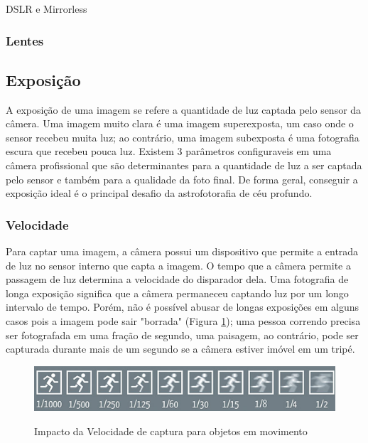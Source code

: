 DSLR e Mirrorless

\subsubsection{Lentes}

\subsection{Exposição}

A exposição de uma imagem se refere a quantidade de luz captada pelo sensor da câmera. Uma imagem muito clara é uma imagem superexposta, um caso onde o sensor recebeu muita luz; ao contrário, uma imagem subexposta é uma fotografia escura que recebeu pouca luz. Existem 3 parâmetros configuraveis em uma câmera profissional que são determinantes para a quantidade de luz a ser captada pelo sensor e também para a qualidade da foto final. \cite{site:eduardoemonica} De forma geral, conseguir a exposição ideal é o principal desafio da astrofotorafia de céu profundo. \cite{livro:astropratica}


\subsubsection{Velocidade}

Para captar uma imagem, a câmera possui um dispositivo que permite a entrada de luz no sensor interno que capta a imagem. O tempo que a câmera permite a passagem de luz determina a velocidade do disparador dela. Uma fotografia de longa exposição significa que a câmera permaneceu captando luz por um longo intervalo de tempo. \cite{book:bbcsky} Porém, não é possível abusar de longas exposições em alguns casos pois a imagem pode sair "borrada" (Figura \ref{fig:velocidade}); uma pessoa correndo precisa ser fotografada em uma fração de segundo, uma paisagem, ao contrário, pode ser capturada durante mais de um segundo se a câmera estiver imóvel em um tripé.  

\begin{figure}[htb]
	\centering
	\caption{Impacto da Velocidade de captura para objetos em movimento}
	\includegraphics[width=0.7\linewidth]{figuras/velocidade}
	\label{fig:velocidade}
\end{figure}

